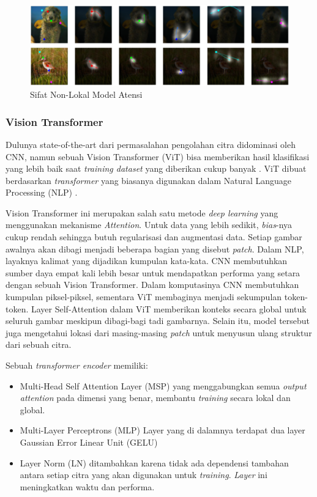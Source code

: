 \documentclass[11pt, a4paper, final]{report}
\begin{document}
\begin{figure}[H]
\centering
\includegraphics[scale=0.4]{assets/AttentionModel2.png}
\caption{Sifat Non-Lokal Model Atensi \cite{zhang2019selfattention}}
\end{figure}

\subsubsection{Vision Transformer}

Dulunya state-of-the-art dari permasalahan pengolahan citra didominasi oleh CNN, namun sebuah Vision Transformer (ViT) bisa memberikan hasil klasifikasi yang lebih baik saat \textit{training dataset} yang diberikan cukup banyak \cite{dosovitskiy2021image}. ViT dibuat berdasarkan \textit{transformer} yang biasanya digunakan dalam Natural Language Processing (NLP) \cite{vaswani2017attention}.

Vision Transformer ini merupakan salah satu metode \textit{deep learning} yang menggunakan mekanisme \textit{Attention}. Untuk data yang lebih sedikit, \textit{bias}-nya cukup rendah sehingga butuh regularisasi dan augmentasi data. Setiap gambar awalnya akan dibagi menjadi beberapa bagian yang disebut \textit{patch}. Dalam NLP, layaknya kalimat yang dijadikan kumpulan kata-kata. CNN membutuhkan sumber daya empat kali lebih besar untuk mendapatkan performa yang setara dengan sebuah Vision Transformer. Dalam komputasinya CNN membutuhkan kumpulan piksel-piksel, sementara ViT membaginya menjadi sekumpulan token-token. Layer Self-Attention dalam ViT memberikan konteks secara global untuk seluruh gambar meskipun dibagi-bagi tadi gambarnya. Selain itu, model tersebut juga mengetahui lokasi dari masing-masing \textit{patch} untuk menyusun ulang struktur dari sebuah citra.

Sebuah \textit{transformer encoder} memiliki:
\begin{itemize}[noitemsep]
    \item Multi-Head Self Attention Layer (MSP) yang menggabungkan semua \textit{output attention} pada dimensi yang benar, membantu \textit{training} secara lokal dan global.
    \item Multi-Layer Perceptrons (MLP) Layer yang di dalamnya terdapat dua layer Gaussian Error Linear Unit (GELU)
    \item Layer Norm (LN) ditambahkan karena tidak ada dependensi tambahan antara setiap citra yang akan digunakan untuk \textit{training}. \textit{Layer} ini meningkatkan waktu dan performa.
\end{itemize}
\end{document}
